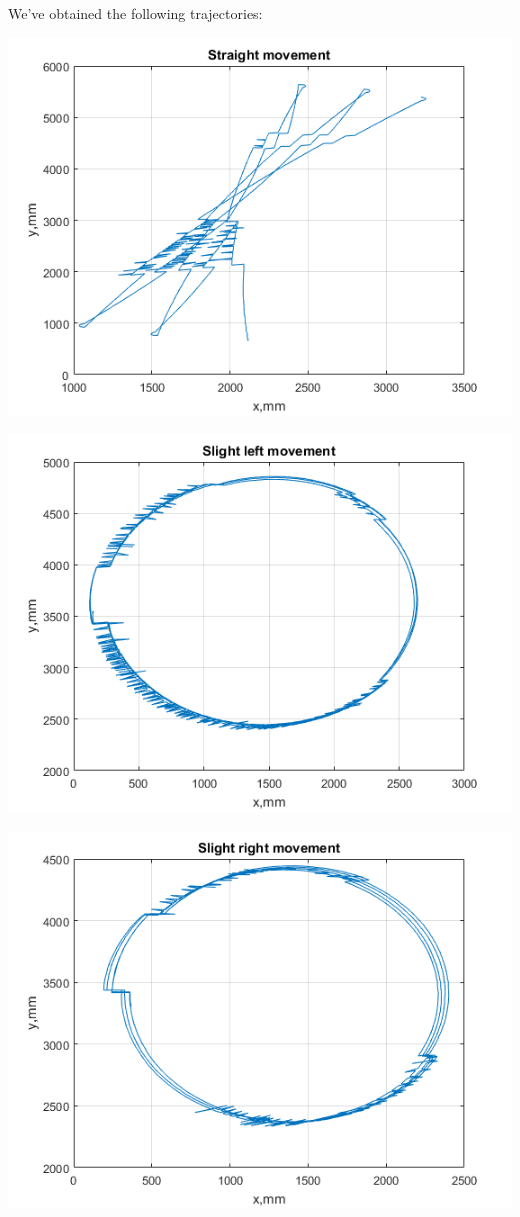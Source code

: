 \documentclass[a4paper, 12pt]{article}
\begin{document}
We've obtained the following trajectories:
\begin{center}
  \includegraphics[scale = 0.8]{s.png}

  \includegraphics[scale = 0.8]{l.png}

  \includegraphics[scale = 0.8]{r.png}


\end{center}
\end{document}
